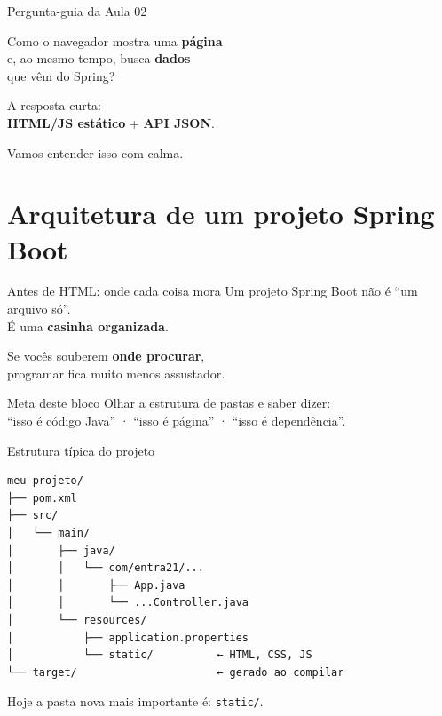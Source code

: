 \documentclass[aspectratio=169,11pt]{beamer}
\begin{document}
\begin{frame}{Pergunta-guia da Aula 02}
  \begin{center}
    \Large
    Como o navegador mostra uma \textbf{página}\\
    e, ao mesmo tempo, busca \textbf{dados}\\
    que vêm do Spring?
  \end{center}

  \vspace{1.2em}
  A resposta curta:\\
  \textbf{HTML/JS estático} + \textbf{API JSON}.

  \vspace{0.8em}
  Vamos entender isso com calma.
\end{frame}

\section{Arquitetura de um projeto Spring Boot}

\begin{frame}{Antes de HTML: onde cada coisa mora}
  Um projeto Spring Boot não é ``um arquivo só''.\\
  É uma \textbf{casinha organizada}.

  \vspace{0.8em}
  Se vocês souberem \textbf{onde procurar},\\
  programar fica muito menos assustador.

  \vspace{0.8em}
  \begin{block}{Meta deste bloco}
    Olhar a estrutura de pastas e saber dizer:\\
    ``isso é código Java'' · ``isso é página'' · ``isso é dependência''.
  \end{block}
\end{frame}

\begin{frame}[fragile]{Estrutura típica do projeto}
\begin{lstlisting}[basicstyle=\ttfamily\footnotesize]
meu-projeto/
├── pom.xml
├── src/
│   └── main/
│       ├── java/
│       │   └── com/entra21/...
│       │       ├── App.java
│       │       └── ...Controller.java
│       └── resources/
│           ├── application.properties
│           └── static/          ← HTML, CSS, JS
└── target/                      ← gerado ao compilar
\end{lstlisting}

  \vspace{0.3em}
  Hoje a pasta nova mais importante é: \texttt{static/}.
\end{frame}
\end{document}

